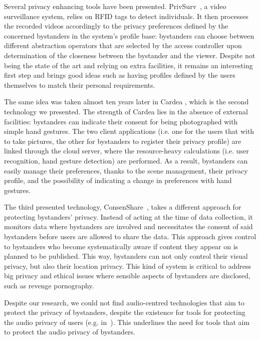 \documentclass[conference]{IEEEtran}
\begin{document}
Several privacy enhancing tools have been presented. PrivSurv~\cite{chinomi2008PriSurv}, a video surveillance system, relies on  \ac{RFID} tags to detect individuals. It then processes the recorded videos accordingly to the privacy preferences defined by the concerned bystanders in the system's profile base: bystanders can choose between different abstraction operators that are selected by the access controller upon determination of the closeness between the bystander and the viewer. Despite not being the state of the art and relying on extra facilities, it remains an interesting first step and brings good ideas such as having profiles defined by the users themselves to match their personal requirements. 

The same idea was taken almost ten years later in Cardea \cite{shu2016cardea}, which is the second technology we presented. The strength of Cardea lies in the absence of external facilities: bystanders can indicate their consent for being photographed with simple hand gestures. The two client applications (i.e. one for the users that with to take pictures, the other for bystanders to register their privacy profile) are linked through the cloud server, where the resource-heavy calculations (i.e. user recognition, hand gesture detection) are performed. As a result, bystanders can easily manage their preferences, thanks to the scene management, their privacy profile, and the possibility of indicating a change in preferences with hand gestures. 

The third presented technology, ConsenShare~\cite{olteanu2018consensual}, takes a different approach for protecting bystanders' privacy. Instead of acting at the time of data collection, it monitors data where bystanders are involved and necessitates the consent of said bystanders before users are allowed to share the data. This approach gives control to bystanders who become systematically aware if content they appear on is planned to be published. This way, bystanders can not only control their visual privacy, but also their location privacy. This kind of system is critical to address big privacy and ethical issues where sensible aspects of bystanders are disclosed, such as revenge pornography. 

Despite our research, we could not find audio-centred technologies that aim to protect the privacy of bystanders, despite the existence for tools for protecting the audio privacy of users (e.g. in~\cite{larson2011accurate, ahmed2020preech}). This underlines the need for tools that aim to protect the audio privacy of bystanders. 
\end{document}
